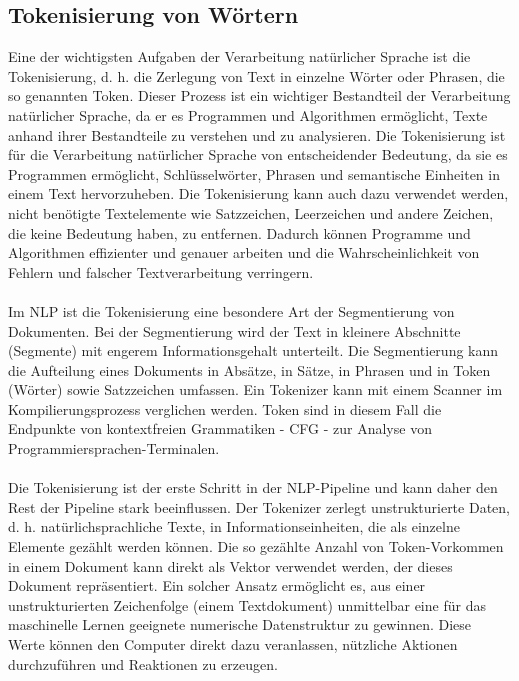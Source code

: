 \subsection{Tokenisierung von Wörtern}
Eine der wichtigsten Aufgaben der Verarbeitung natürlicher Sprache ist die Tokenisierung, d. h. die Zerlegung von Text in einzelne Wörter oder Phrasen, die so genannten Token. 
Dieser Prozess ist ein wichtiger Bestandteil der Verarbeitung natürlicher Sprache, da er es Programmen und Algorithmen ermöglicht, Texte anhand ihrer Bestandteile zu verstehen und zu analysieren. 
Die Tokenisierung ist für die Verarbeitung natürlicher Sprache von entscheidender Bedeutung, da sie es Programmen ermöglicht, Schlüsselwörter, Phrasen und semantische Einheiten in einem Text hervorzuheben. 
Die Tokenisierung kann auch dazu verwendet werden, nicht benötigte Textelemente wie Satzzeichen, Leerzeichen und andere Zeichen, die keine Bedeutung haben, zu entfernen. 
Dadurch können Programme und Algorithmen effizienter und genauer arbeiten und die Wahrscheinlichkeit von Fehlern und falscher Textverarbeitung verringern. \cite{jurafsky_speech_2009}\\\\
Im \ac{NLP} ist die Tokenisierung eine besondere Art der Segmentierung von Dokumenten. 
Bei der Segmentierung wird der Text in kleinere Abschnitte (Segmente) mit engerem Informationsgehalt unterteilt. 
Die Segmentierung kann die Aufteilung eines Dokuments in Absätze, in Sätze, in Phrasen und in Token (Wörter) sowie Satzzeichen umfassen. 
Ein Tokenizer kann mit einem Scanner im Kompilierungsprozess verglichen werden. 
Token sind in diesem Fall die Endpunkte von kontextfreien Grammatiken - \ac{CFG} - zur Analyse von Programmiersprachen-Terminalen. \cite{bird_natural_2009}\\\\
Die Tokenisierung ist der erste Schritt in der \ac{NLP}-Pipeline und kann daher den Rest der Pipeline stark beeinflussen. 
Der Tokenizer zerlegt unstrukturierte Daten, d. h. natürlichsprachliche Texte, in Informationseinheiten, die als einzelne Elemente gezählt werden können. 
Die so gezählte Anzahl von Token-Vorkommen in einem Dokument kann direkt als Vektor verwendet werden, der dieses Dokument repräsentiert. 
Ein solcher Ansatz ermöglicht es, aus einer unstrukturierten Zeichenfolge (einem Textdokument) unmittelbar eine für das maschinelle Lernen geeignete numerische Datenstruktur zu gewinnen. 
Diese Werte können den Computer direkt dazu veranlassen, nützliche Aktionen durchzuführen und Reaktionen zu erzeugen. \cite{lane_natural_2019}\\\\
